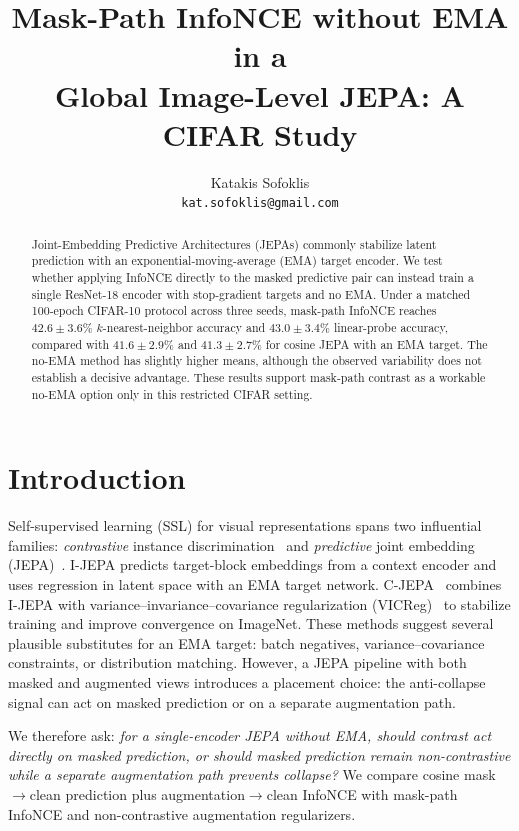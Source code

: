 \documentclass[11pt,twocolumn]{article}
\title{\textbf{Mask-Path InfoNCE without EMA in a\\
Global Image-Level JEPA: A CIFAR Study}}
\author{%
  Katakis Sofoklis\\
  \texttt{kat.sofoklis@gmail.com}
}
\date{}
\begin{document}
\maketitle

\begin{abstract}
Joint-Embedding Predictive Architectures (JEPAs) commonly stabilize latent
prediction with an exponential-moving-average (EMA) target encoder. We test
whether applying InfoNCE directly to the masked predictive pair can instead
train a single ResNet-18 encoder with stop-gradient targets and no EMA. Under a
matched 100-epoch CIFAR-10 protocol across three seeds, mask-path InfoNCE reaches
$42.6\mathbin{\pm}3.6\%$ $k$-nearest-neighbor accuracy and
$43.0\mathbin{\pm}3.4\%$ linear-probe accuracy, compared with
$41.6\mathbin{\pm}2.9\%$ and $41.3\mathbin{\pm}2.7\%$ for cosine JEPA with an
EMA target. The no-EMA method has slightly higher means, although the observed
variability does not establish a decisive advantage. These results support
mask-path contrast as a workable no-EMA option only in this restricted CIFAR
setting.
\end{abstract}
\section{Introduction}
\label{sec:intro}

Self-supervised learning (SSL) for visual representations spans two influential families:
\emph{contrastive} instance discrimination~\citep{chen2020simclr,he2020moco}
and \emph{predictive} joint embedding (JEPA)~\citep{assran2023ijepa,lecun2022path}.
I-JEPA predicts target-block embeddings from a context encoder and uses
regression in latent space with an EMA target network.
C-JEPA~\citep{mo2024cjepa} combines I-JEPA with variance--invariance--covariance
regularization (VICReg)~\citep{bardes2022vicreg} to stabilize training and improve
convergence on ImageNet.
These methods suggest several plausible substitutes for an EMA target: batch
negatives, variance--covariance constraints, or distribution matching.
However, a JEPA pipeline with both masked and augmented views introduces a
placement choice: the anti-collapse signal can act on masked prediction or on
a separate augmentation path.

We therefore ask: \emph{for a single-encoder JEPA without EMA, should contrast
act directly on masked prediction, or should masked prediction remain
non-contrastive while a separate augmentation path prevents collapse?} We
compare cosine mask$\rightarrow$clean prediction plus augmentation$\rightarrow$clean
InfoNCE with mask-path InfoNCE and non-contrastive augmentation regularizers.
\end{document}
